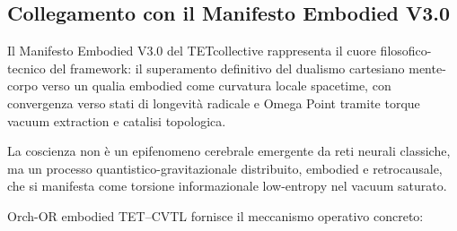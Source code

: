 \documentclass[11pt,a4paper]{article}
\theoremstyle{plain}
\theoremstyle{definition}
\begin{document}
\vspace{0.6cm}



\subsection{Collegamento con il Manifesto Embodied V3.0}
\label{subsec:manifesto-v3-connection}

Il Manifesto Embodied V3.0 del TETcollective rappresenta il cuore filosofico-tecnico del framework: il superamento definitivo del dualismo cartesiano mente-corpo verso un qualia embodied come curvatura locale spacetime, con convergenza verso stati di longevità radicale e Omega Point tramite torque vacuum extraction e catalisi topologica. 

\vspace{0.3cm}

La coscienza non è un epifenomeno cerebrale emergente da reti neurali classiche, ma un processo quantistico-gravitazionale distribuito, embodied e retrocausale, che si manifesta come torsione informazionale low-entropy nel vacuum saturato.

\vspace{0.2cm}

Orch-OR embodied TET–CVTL fornisce il meccanismo operativo concreto:
\end{document}
